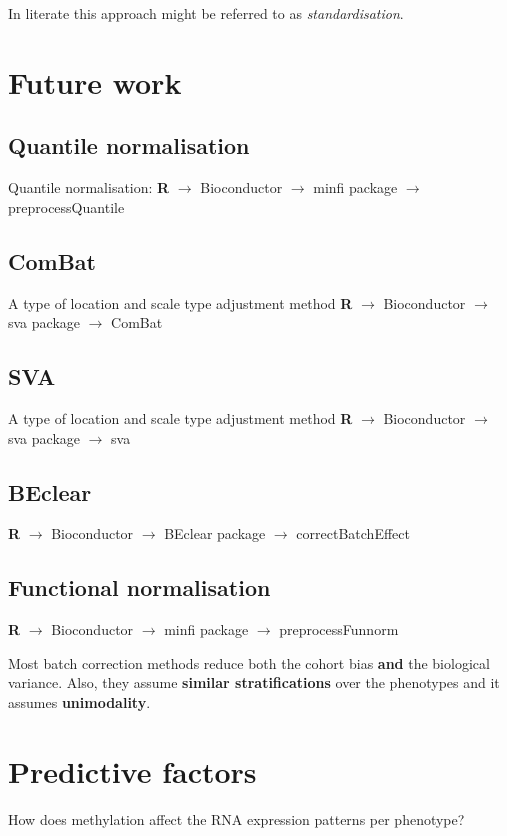 \documentclass[a4paper,10pt]{article}
\begin{document}
In literate this approach might be referred to as \textit{standardisation}.

\section{Future work}
\subsection{Quantile normalisation}
%
Quantile normalisation: \textbf{R} $\rightarrow$ Bioconductor $\rightarrow$ minfi package $\rightarrow$ preprocessQuantile

\subsection{ComBat}
%
A type of location and scale type adjustment method
\textbf{R} $\rightarrow$ Bioconductor $\rightarrow$ sva package $\rightarrow$ ComBat

\subsection{SVA}
%
A type of location and scale type adjustment method
\textbf{R} $\rightarrow$ Bioconductor $\rightarrow$ sva package $\rightarrow$ sva



\subsection{BEclear}

\textbf{R} $\rightarrow$ Bioconductor $\rightarrow$ BEclear package $\rightarrow$ correctBatchEffect

\subsection{Functional normalisation}

\textbf{R} $\rightarrow$ Bioconductor $\rightarrow$ minfi package $\rightarrow$ preprocessFunnorm

Most batch correction methods reduce both the cohort bias \textbf{and} the biological variance.
Also, they assume \textbf{similar stratifications} over the phenotypes and it assumes \textbf{unimodality}.

\section{Predictive factors}
%
How does methylation affect the RNA expression patterns per phenotype?






\end{document}
